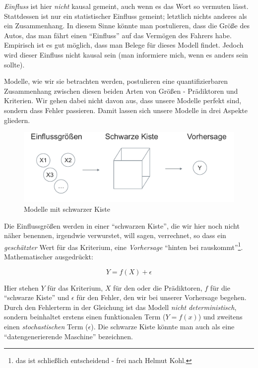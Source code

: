 \documentclass[12pt,ngerman,]{book}
\let\rmarkdownfootnote\footnote%
\def\footnote{\protect\rmarkdownfootnote}
\let\BeginKnitrBlock\begin \let\EndKnitrBlock\end
\begin{document}
\BeginKnitrBlock{rmdcaution}
\emph{Einfluss} ist hier \emph{nicht} kausal gemeint, auch wenn es das
Wort so vermuten lässt. Stattdessen ist nur ein statistischer Einfluss
gemeint; letztlich nichts anderes als ein Zusammenhang. In diesem Sinne
könnte man postulieren, dass die Größe des Autos, das man fährt einen
``Einfluss'' auf das Vermögen des Fahrers habe. Empirisch ist es gut
möglich, dass man Belege für dieses Modell findet. Jedoch wird dieser
Einfluss nicht kausal sein (man informiere mich, wenn es anders sein
sollte).
\EndKnitrBlock{rmdcaution}

Modelle, wie wir sie betrachten werden, postulieren eine
quantifizierbaren Zusammenhang zwischen diesen beiden Arten von Größen -
Prädiktoren und Kriterien. Wir gehen dabei nicht davon aus, dass unsere
Modelle perfekt sind, sondern dass Fehler passieren. Damit lassen sich
unsere Modelle in drei Aspekte gliedern.

\begin{figure}

{\centering \includegraphics[width=0.7\linewidth]{images/Modell_Blackbox} 

}

\caption{Modelle mit schwarzer Kiste}\label{fig:fig-blackbox}
\end{figure}

Die Einflussgrößen werden in einer ``schwarzen Kiste'', die wir hier
noch nicht näher benennen, irgendwie verwurstet, will sagen, verrechnet,
so dass ein \emph{geschätzter} Wert für das Kriterium, eine
\emph{Vorhersage} ``hinten bei rauskommt''\footnote{das ist schließlich
  entscheidend - frei nach Helmut Kohl.}. Mathematischer ausgedrückt:

\[Y = f(X) + \epsilon\]

Hier stehen \(Y\) für das Kriterium, \(X\) für den oder die Prädiktoren,
\(f\) für die ``schwarze Kiste'' und \(\epsilon\) für den Fehler, den
wir bei unserer Vorhersage begehen. Durch den Fehlerterm in der
Gleichung ist das Modell \emph{nicht}
\emph{deterministisch}, sondern beinhaltet
erstens einen funktionalen Term (\(Y=f(x)\)) und zweitens einen
\emph{stochastischen} Term (\(\epsilon\)). Die schwarze Kiste könnte man
auch als eine ``datengenerierende Maschine'' bezeichnen.
\end{document}
